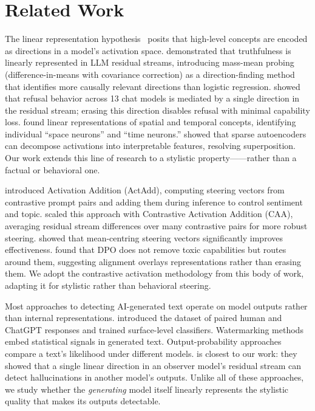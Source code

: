 \section{Related Work}
\label{sec:related}

The linear representation hypothesis~\citep{park2023linear} posits that high-level concepts are encoded as directions in a model's activation space.
\citet{marks2024geometry} demonstrated that truthfulness is linearly represented in LLM residual streams, introducing mass-mean probing (difference-in-means with covariance correction) as a direction-finding method that identifies more causally relevant directions than logistic regression.
\citet{arditi2024refusal} showed that refusal behavior across 13 chat models is mediated by a single direction in the residual stream; erasing this direction disables refusal with minimal capability loss.
\citet{gurnee2023language} found linear representations of spatial and temporal concepts, identifying individual ``space neurons'' and ``time neurons.''
\citet{cunningham2023sparse} showed that sparse autoencoders can decompose activations into interpretable features, resolving superposition.
Our work extends this line of research to a stylistic property---\aistyle---rather than a factual or behavioral one.

\citet{turner2023activation} introduced Activation Addition (ActAdd), computing steering vectors from contrastive prompt pairs and adding them during inference to control sentiment and topic.
\citet{rimsky2024steering} scaled this approach with Contrastive Activation Addition (CAA), averaging residual stream differences over many contrastive pairs for more robust steering.
\citet{jorgensen2023improving} showed that mean-centring steering vectors significantly improves effectiveness.
\citet{lee2024mechanistic} found that DPO does not remove toxic capabilities but routes around them, suggesting alignment overlays representations rather than erasing them.
We adopt the contrastive activation methodology from this body of work, adapting it for stylistic rather than behavioral steering.

Most approaches to detecting AI-generated text operate on model outputs rather than internal representations.
\citet{guo2023hc3} introduced the \hcthree dataset of paired human and ChatGPT responses and trained surface-level classifiers.
Watermarking methods~\citep{kirchenbauer2023watermark} embed statistical signals in generated text.
Output-probability approaches compare a text's likelihood under different models.
\citet{oneill2025single} is closest to our work: they showed that a single linear direction in an observer model's residual stream can detect hallucinations in another model's outputs.
Unlike all of these approaches, we study whether the \emph{generating} model itself linearly represents the stylistic quality that makes its outputs detectable.

